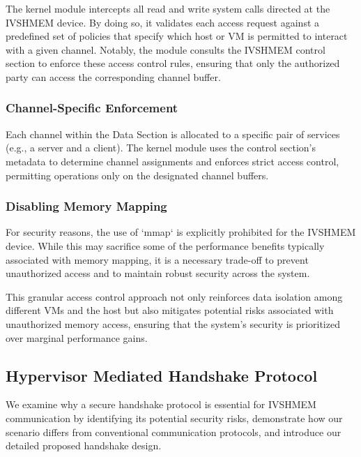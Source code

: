 \documentclass[letterpaper,twocolumn,10pt]{article}
\begin{document}
The kernel module intercepts all read and write system calls directed at the IVSHMEM device. By doing so, it validates each access request against a predefined set of policies that specify which host or VM is permitted to interact with a given channel. Notably, the module consults the IVSHMEM control section to enforce these access control rules, ensuring that only the authorized party can access the corresponding channel buffer.



\subsubsection{Channel-Specific Enforcement}

Each channel within the Data Section is allocated to a specific pair of services (e.g., a server and a client). The kernel module uses the control section's metadata to determine channel assignments and enforces strict access control, permitting operations only on the designated channel buffers.



\subsubsection{Disabling Memory Mapping}

For security reasons, the use of `mmap` is explicitly prohibited for the IVSHMEM device. While this may sacrifice some of the performance benefits typically associated with memory mapping, it is a necessary trade-off to prevent unauthorized access and to maintain robust security across the system.

This granular access control approach not only reinforces data isolation among different VMs and the host but also mitigates potential risks associated with unauthorized memory access, ensuring that the system's security is prioritized over marginal performance gains.



\subsection{Hypervisor Mediated Handshake Protocol}

We examine why a secure handshake protocol is essential for IVSHMEM communication by identifying its potential security risks, demonstrate how our scenario differs from conventional communication protocols, and introduce our detailed proposed handshake design.
\end{document}
